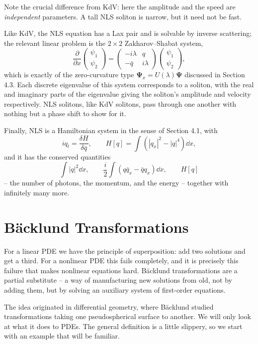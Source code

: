 \documentclass[a4paper]{scrartcl}
\begin{document}
Note the crucial difference from KdV: here the amplitude and the speed are \emph{independent} parameters. A tall NLS soliton is narrow, but it need not be fast.

Like KdV, the NLS equation has a Lax pair and is solvable by inverse scattering; the relevant linear problem is the $2\times2$ Zakharov--Shabat system,
$$
\frac{\partial}{\partial x}\begin{pmatrix}\psi_1\\\psi_2\end{pmatrix} = \begin{pmatrix}-i\lambda & q\\ -\bar q & i\lambda\end{pmatrix}\begin{pmatrix}\psi_1\\\psi_2\end{pmatrix},
$$
which is exactly of the zero-curvature type $\bm\Psi_x = U(\lambda)\bm\Psi$ discussed in Section 4.3. Each discrete eigenvalue of this system corresponds to a soliton, with the real and imaginary parts of the eigenvalue giving the soliton's amplitude and velocity respectively. NLS solitons, like KdV solitons, pass through one another with nothing but a phase shift to show for it.

Finally, NLS is a Hamiltonian system in the sense of Section 4.1, with
$$
iq_t = \frac{\delta H}{\delta\bar q}, \qquad H[q] = \int\left(|q_x|^2 - |q|^4\right)\dd x,
$$
and it has the conserved quantities
$$
\int|q|^2\dd x, \qquad \frac{i}{2}\int\left(q\bar q_x - \bar q q_x\right)\dd x, \qquad H[q]
$$
-- the number of photons, the momentum, and the energy -- together with infinitely many more.

\section{B\"acklund Transformations}

For a linear PDE we have the principle of superposition: add two solutions and get a third. For a nonlinear PDE this fails completely, and it is precisely this failure that makes nonlinear equations hard. B\"acklund transformations are a partial substitute -- a way of manufacturing new solutions from old, not by adding them, but by solving an auxiliary system of first-order equations.

The idea originated in differential geometry, where B\"acklund studied transformations taking one pseudospherical surface to another. We will only look at what it does to PDEs. The general definition is a little slippery, so we start with an example that will be familiar.
\end{document}
